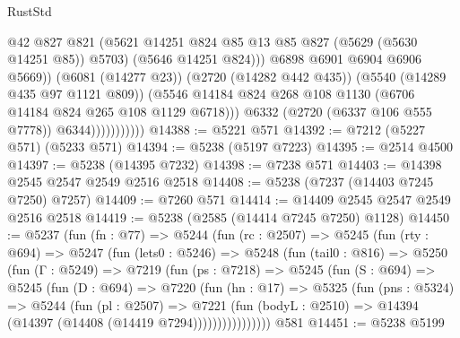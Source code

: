\begin{lexlean}{RustStd}
\begin{coremodule}
                                    @42
                                    @827
                                    @821
                                    (@5621
                                      @14251
                                      @824
                                      @85
                                      @13
                                      @85
                                      @827
                                      (@5629 (@5630 @14251 @85))
                                      @5703)
                                    (@5646 @14251 @824)))
                                @6898
                                @6901
                                @6904
                                @6906
                                @5669))
                            (@6081 (@14277 @23))
                            (@2720 (@14282 @442 @435))
                            (@5540 (@14289 @435 @97 @1121 @809))
                            (@5546
                              @14184
                              @824
                              @268
                              @108
                              @1130
                              (@6706 @14184 @824 @265 @108 @1129 @6718)))
                          @6332
                          (@2720 (@6337 @106 @555 @7778))
                          @6344)))))))))))
@14388 := @5221 @571
@14392 := @7212 (@5227 @571) (@5233 @571)
@14394 := @5238 (@5197 @7223)
@14395 := @2514 @4500
@14397 := @5238 (@14395 @7232)
@14398 := @7238 @571
@14403 := @14398 @2545 @2547 @2549 @2516 @2518
@14408 := @5238 (@7237 (@14403 @7245 @7250) @7257)
@14409 := @7260 @571
@14414 := @14409 @2545 @2547 @2549 @2516 @2518
@14419 := @5238 (@2585 (@14414 @7245 @7250) @1128)
@14450 := @5237
    (fun (fn : @77) =>
    @5244
      (fun (rc : @2507) =>
      @5245
        (fun (rty : @694) =>
        @5247
          (fun (lets0 : @5246) =>
          @5248
            (fun (tail0 : @816) =>
            @5250
              (fun (Γ : @5249) =>
              @7219
                (fun (ps : @7218) =>
                @5245
                  (fun (S : @694) =>
                  @5245
                    (fun (D : @694) =>
                    @7220
                      (fun (hn : @17) =>
                      @5325
                        (fun (pns : @5324) =>
                        @5244
                          (fun (pl : @2507) =>
                          @7221
                            (fun (bodyL : @2510) =>
                            @14394 (@14397 (@14408 (@14419 @7294))))))))))))))))
    @581
@14451 := @5238 @5199

\end{coremodule}
\end{lexlean}
